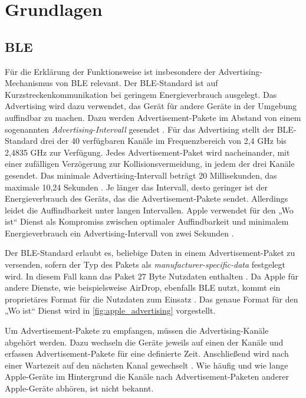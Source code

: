 \section{Grundlagen}
\label{sec:grundlagen}

\subsection{\ac{BLE}}

Für die Erklärung der Funktionsweise ist insbesondere der Advertising-Mechanismus von \ac{BLE} relevant.
Der \ac{BLE}-Standard ist auf Kurzstreckenkommunikation bei geringem Energieverbrauch ausgelegt.
Das Advertising wird dazu verwendet, das Gerät für andere Geräte in der Umgebung auffindbar zu machen.
Dazu werden Advertisement-Pakete im Abstand von einem sogenannten \textit{Advertising-Intervall} gesendet \cite{Spec_BLE_5.3}.
Für das Advertising stellt der \ac{BLE}-Standard drei der 40 verfügbaren Kanäle im Frequenzbereich von 2,4 GHz bis 2,4835 GHz zur Verfügung.
Jedes Advertisement-Paket wird nacheinander, mit einer zufälligen Verzögerung zur Kollisionsvermeidung, in jedem der drei Kanäle gesendet.
Das minimale Advertising-Intervall beträgt 20 Millisekunden, das maximale 10,24 Sekunden \cite{Spec_BLE_5.3}.
Je länger das Intervall, desto geringer ist der Energieverbrauch des Geräts, das die Advertisement-Pakete sendet.
Allerdings leidet die Auffindbarkeit unter langen Intervallen.
Apple verwendet für den „Wo ist“ Dienst als Kompromiss zwischen optimaler Auffindbarkeit und minimalem Energieverbrauch ein Advertising-Intervall von zwei Sekunden \cite{Apple_FindMySpec}.


Der \ac{BLE}-Standard erlaubt es, beliebige Daten in einem Advertisement-Paket zu versenden, sofern der Typ des Pakets als \textit{manufacturer-specific-data} festgelegt wird.
In diesem Fall kann das Paket 27 Byte Nutzdaten enthalten \cite{Spec_BLE_5.3}.
Da Apple für andere Dienste, wie beispielsweise AirDrop, ebenfalls \ac{BLE} nutzt, kommt ein proprietäres Format für die Nutzdaten zum Einsatz \cite{Heinrich_FindMy}.
Das genaue Format für den „Wo ist“ Dienst wird in \autoref{fig:apple_advertising} vorgestellt.

Um Advertisement-Pakete zu empfangen, müssen die Advertising-Kanäle abgehört werden.
Dazu wechseln die Geräte jeweils auf einen der Kanäle und erfassen Advertisement-Pakete für eine definierte Zeit.
Anschließend wird nach einer Wartezeit auf den nächsten Kanal gewechselt \cite{Spec_BLE_5.3}.
Wie häufig und wie lange Apple-Geräte im Hintergrund die Kanäle nach Advertisement-Paketen anderer Apple-Geräte abhören, ist nicht bekannt.
